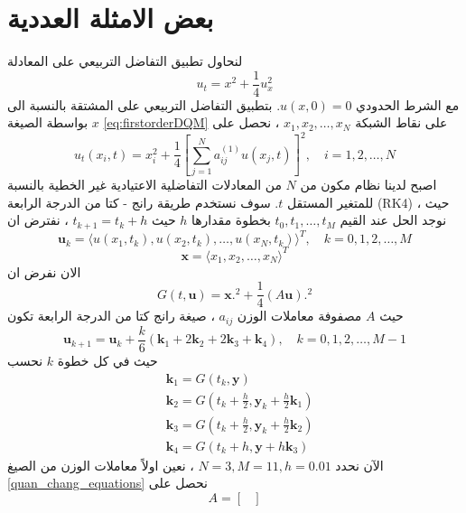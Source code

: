 \section{بعض الامثلة العددية}
\begin{example}
	لنحاول تطبيق التفاضل التربيعي على المعادلة 
	\begin{equation}
		\label{eq:firstex}
		u_t = x^2 + \frac{1}{4} u_x^2
	\end{equation}
	مع الشرط الحدودي $u(x,0) = 0$. بتطبيق التفاضل التربيعي على المشتقة بالنسبة الى $x$ بواسطة الصيغة \eqref{eq:firstorderDQM} على نقاط الشبكة $x_1, x_2, \dots, x_N$ ، نحصل على
	\begin{equation}
		\label{eq:firstexapplied}
		u_t (x_i, t) = x_i^2 + \frac{1}{4} \left[\sum_{j=1}^{N} a_{ij}^{(1)} u(x_j, t)\right]^2 , \quad i=1,2,\dots,N
 	\end{equation}
 	اصبح لدينا نظام مكون من $N$ من المعادلات التفاضلية الاعتيادية غير الخطية بالنسبة للمتغير المستقل $t$. سوف نستخدم طريقة رانج - كتا من الدرجة الرابعة (RK4) ، حيث نوجد الحل عند القيم $t_0, t_1, \dots, t_M$ بخطوة مقدارها $h$ حيث $t_{k+1} = t_k + h$ ، نفترض ان 
 	\[
 	\mathbf{u}_k = \langle u(x_1, t_k) , u(x_2,t_k), \dots, u(x_N, t_k)\rangle^T, \quad k=0,1,2,\dots,M
 	\]
 	\[
 	\mathbf{x} = \langle x_1, x_2, \dots, x_N\rangle^T
 	\]
 	الان نفرض ان
 	\[
 	G(t, \mathbf{u}) = \mathbf{x}.^2 + \frac{1}{4} (A \mathbf{u}).^2
 	\]
 	حيث $A$ مصفوفة معاملات الوزن $a_{ij}$ ، صيغة رانج كتا من الدرجة الرابعة تكون
 	\begin{equation}
 		\label{eq:firstexRK4}
 		\mathbf{u}_{k+1} = \mathbf{u}_k + \frac{k}{6} (\mathbf{k}_1+2\mathbf{k}_2+2\mathbf{k}_3+\mathbf{k}_4), \quad k=0,1,2,\dots,M-1
 	\end{equation}
 	حيث في كل خطوة $k$ نحسب
\begin{equation}
	 	\label{eq:RK4coeffs}
 	\begin{aligned}
 		&\mathbf{k}_1 = G(t_k, \mathbf{y})\\
 		&\mathbf{k}_2 = G\left(t_k + \frac{h}{2}, \mathbf{y}_k + \frac{h}{2}\mathbf{k}_1  \right)\\
 		&\mathbf{k}_3 = G\left(t_k + \frac{h}{2}, \mathbf{y}_k + \frac{h}{2}\mathbf{k}_2  \right)\\
 		&\mathbf{k}_4 = G(t_k + h, \mathbf{y} + h\mathbf{k}_3)
 	\end{aligned}
\end{equation}
 	الآن نحدد $N=3, M=11, h=0.01 $ ، نعين اولاً معاملات الوزن من الصيغ \eqref{quan_chang_equations} نحصل على 
 	\[
 	A = 
\begin{bmatrix}

\end{bmatrix}\]
\end{example}
